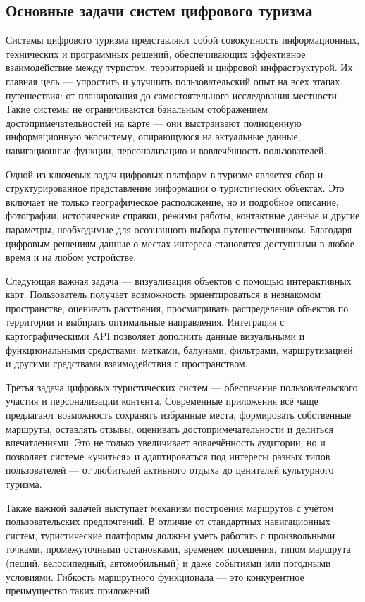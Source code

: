 \subsection{Основные задачи систем цифрового туризма}

Системы цифрового туризма представляют собой совокупность информационных, технических и программных решений, обеспечивающих эффективное взаимодействие между туристом, территорией и цифровой инфраструктурой. Их главная цель — упростить и улучшить пользовательский опыт на всех этапах путешествия: от планирования до самостоятельного исследования местности. Такие системы не ограничиваются банальным отображением достопримечательностей на карте — они выстраивают полноценную информационную экосистему, опирающуюся на актуальные данные, навигационные функции, персонализацию и вовлечённость пользователей.

Одной из ключевых задач цифровых платформ в туризме является сбор и структурированное представление информации о туристических объектах. Это включает не только географическое расположение, но и подробное описание, фотографии, исторические справки, режимы работы, контактные данные и другие параметры, необходимые для осознанного выбора путешественником. Благодаря цифровым решениям данные о местах интереса становятся доступными в любое время и на любом устройстве.

Следующая важная задача — визуализация объектов с помощью интерактивных карт. Пользователь получает возможность ориентироваться в незнакомом пространстве, оценивать расстояния, просматривать распределение объектов по территории и выбирать оптимальные направления. Интеграция с картографическими API позволяет дополнить данные визуальными и функциональными средствами: метками, балунами, фильтрами, маршрутизацией и другими средствами взаимодействия с пространством.

Третья задача цифровых туристических систем — обеспечение пользовательского участия и персонализации контента. Современные приложения всё чаще предлагают возможность сохранять избранные места, формировать собственные маршруты, оставлять отзывы, оценивать достопримечательности и делиться впечатлениями. Это не только увеличивает вовлечённость аудитории, но и позволяет системе «учиться» и адаптироваться под интересы разных типов пользователей — от любителей активного отдыха до ценителей культурного туризма.

Также важной задачей выступает механизм построения маршрутов с учётом пользовательских предпочтений. В отличие от стандартных навигационных систем, туристические платформы должны уметь работать с произвольными точками, промежуточными остановками, временем посещения, типом маршрута (пеший, велосипедный, автомобильный) и даже событиями или погодными условиями. Гибкость маршрутного функционала — это конкурентное преимущество таких приложений.

